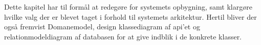 Dette kapitel har til formål at redegøre for systemets opbygning, samt klargøre hvilke valg 
der er blevet taget i forhold til systemets arkitektur. Hertil bliver der også fremvist Domanemodel, 
design klassediagram af api'et og relationmodeldiagram af databasen for at give indblik i de konkrete klasser.